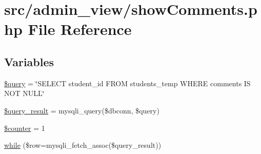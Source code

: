 \hypertarget{showComments_8php}{\section{src/admin\-\_\-view/show\-Comments.php \-File \-Reference}
\label{showComments_8php}
}
\subsection*{\-Variables}
\begin{DoxyCompactItemize}
\item 
\hyperlink{showComments_8php_af59a5f7cd609e592c41dc3643efd3c98}{\$query} = \char`\"{}\-S\-E\-L\-E\-C\-T student\-\_\-id \-F\-R\-O\-M students\-\_\-temp \-W\-H\-E\-R\-E comments \-I\-S \-N\-O\-T \-N\-U\-L\-L\char`\"{}
\item 
\hyperlink{showComments_8php_ade0b3dacf5d65d8f2293ffa78561fe31}{\$query\-\_\-result} = mysqli\-\_\-query(\$dbconn, \$query)
\item 
\hyperlink{showComments_8php_adc0a189fac719187ba2e6f01ca0f2466}{\$counter} = 1
\item 
\hyperlink{showComments_8php_abbca5b4e0da1a7b7e95bb777ad93473d}{while} (\$row=mysqli\-\_\-fetch\-\_\-assoc(\$query\-\_\-result))
\end{DoxyCompactItemize}


